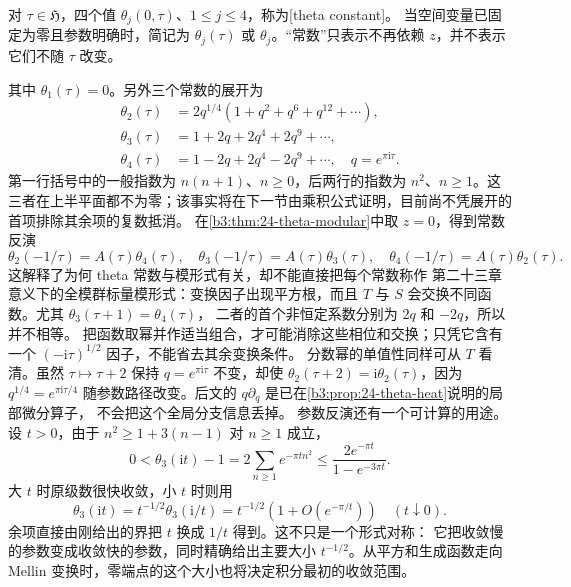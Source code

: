 \begin{definition}\label{b3:def:24-theta-constants}
对 \(\tau\in\mathfrak H\)，四个值
\(\theta_j(0,\tau)\)、\(1\le j\le4\)，称为[theta constant]。
当空间变量已固定为零且参数明确时，简记为
\(\theta_j(\tau)\) 或 \(\theta_j\)。“常数”只表示不再依赖 \(z\)，并不表示它们不随 \(\tau\) 改变。
\end{definition}

其中 \(\theta_1(\tau)=0\)。另外三个常数的展开为
\begin{equation}\label{b3:eq:24-theta-constant-series}
\begin{aligned}
 \theta_2(\tau)&=2q^{1/4}(1+q^2+q^6+q^{12}+\cdots),\\
 \theta_3(\tau)&=1+2q+2q^4+2q^9+\cdots,\\
 \theta_4(\tau)&=1-2q+2q^4-2q^9+\cdots,
 \quad q=e^{\pi\mathrm i\tau}.
\end{aligned}
\end{equation}
第一行括号中的一般指数为 \(n(n+1)\)、\(n\ge0\)，后两行的指数为
\(n^2\)、\(n\ge1\)。这三者在上半平面都不为零；该事实将在下一节由乘积公式证明，目前尚不凭展开的首项排除其余项的复数抵消。
\ProseParagraphBreak
在\cref{b3:thm:24-theta-modular}中取 \(z=0\)，得到常数反演
\[
 \theta_2(-1/\tau)=A(\tau)\theta_4(\tau),\quad
 \theta_3(-1/\tau)=A(\tau)\theta_3(\tau),\quad
 \theta_4(-1/\tau)=A(\tau)\theta_2(\tau).
\]
这解释了为何 theta 常数与模形式有关，却不能直接把每个常数称作
第二十三章意义下的全模群标量模形式：变换因子出现平方根，而且
\(T\) 与 \(S\) 会交换不同函数。尤其 \(\theta_3(\tau+1)=\theta_4(\tau)\)，
二者的首个非恒定系数分别为 \(2q\) 和 \(-2q\)，所以并不相等。
把函数取幂并作适当组合，才可能消除这些相位和交换；只凭它含有一个
\((-\mathrm i\tau)^{1/2}\) 因子，不能省去其余变换条件。
\ProseParagraphBreak
分数幂的单值性同样可从 \(T\) 看清。虽然 \(\tau\mapsto\tau+2\) 保持
\(q=e^{\pi\mathrm i\tau}\) 不变，却使
\(\theta_2(\tau+2)=\mathrm i\theta_2(\tau)\)，因为
\(q^{1/4}=e^{\pi\mathrm i\tau/4}\) 随参数路径改变。后文的
\(q\partial_q\) 是已在\cref{b3:prop:24-theta-heat}说明的局部微分算子，
不会把这个全局分支信息丢掉。
\ProseParagraphBreak
参数反演还有一个可计算的用途。设 \(t>0\)，由于
\(n^2\ge1+3(n-1)\) 对 \(n\ge1\) 成立，
\[
 0<\theta_3(\mathrm it)-1
       =2\sum_{n\ge1}e^{-\pi tn^2}
       \le\frac{2e^{-\pi t}}{1-e^{-3\pi t}}.
\]
大 \(t\) 时原级数很快收敛，小 \(t\) 时则用
\[
 \theta_3(\mathrm it)=t^{-1/2}\theta_3(\mathrm i/t)
     =t^{-1/2}\left(1+O(e^{-\pi/t})\right)
     \quad(t\downarrow0).
\]
余项直接由刚给出的界把 \(t\) 换成 \(1/t\) 得到。这不只是一个形式对称：
它把收敛慢的参数变成收敛快的参数，同时精确给出主要大小
\(t^{-1/2}\)。从平方和生成函数走向 Mellin 变换时，零端点的这个大小也将决定积分最初的收敛范围。
